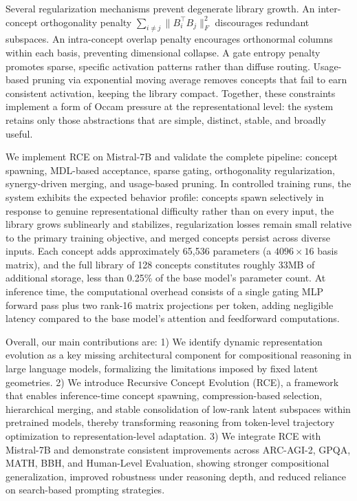 \documentclass[11pt]{article}
\begin{document}
Several regularization mechanisms prevent degenerate library growth. An inter-concept orthogonality penalty $\sum_{i \neq j} \|B_i^\top B_j\|_F^2$ discourages redundant subspaces. An intra-concept overlap penalty encourages orthonormal columns within each basis, preventing dimensional collapse. A gate entropy penalty promotes sparse, specific activation patterns rather than diffuse routing. Usage-based pruning via exponential moving average removes concepts that fail to earn consistent activation, keeping the library compact. Together, these constraints implement a form of Occam pressure at the representational level: the system retains only those abstractions that are simple, distinct, stable, and broadly useful.

We implement RCE on Mistral-7B \cite{jiang2023mistral} and validate the complete pipeline: concept spawning, MDL-based acceptance, sparse gating, orthogonality regularization, synergy-driven merging, and usage-based pruning. In controlled training runs, the system exhibits the expected behavior profile: concepts spawn selectively in response to genuine representational difficulty rather than on every input, the library grows sublinearly and stabilizes, regularization losses remain small relative to the primary training objective, and merged concepts persist across diverse inputs. Each concept adds approximately 65,536 parameters (a $4096 \times 16$ basis matrix), and the full library of 128 concepts constitutes roughly 33MB of additional storage, less than 0.25\% of the base model's parameter count. At inference time, the computational overhead consists of a single gating MLP forward pass plus two rank-16 matrix projections per token, adding negligible latency compared to the base model's attention and feedforward computations.

Overall, our main contributions are: 1) We identify dynamic representation evolution as a key missing architectural component for compositional reasoning in large language models, formalizing the limitations imposed by fixed latent geometries. 2) We introduce Recursive Concept Evolution (RCE), a framework that enables inference-time concept spawning, compression-based selection, hierarchical merging, and stable consolidation of low-rank latent subspaces within pretrained models, thereby transforming reasoning from token-level trajectory optimization to representation-level adaptation. 3) We integrate RCE with Mistral-7B and demonstrate consistent improvements across ARC-AGI-2, GPQA, MATH, BBH, and Human-Level Evaluation, showing stronger compositional generalization, improved robustness under reasoning depth, and reduced reliance on search-based prompting strategies.
\end{document}
